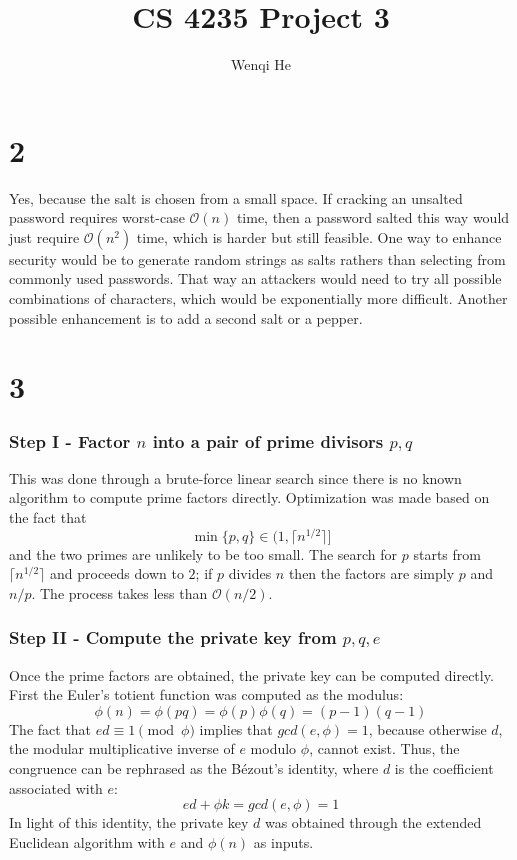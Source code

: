 \documentclass[11pt]{article}
\title{CS 4235 Project 3}
\author{Wenqi He}
\begin{document}
\maketitle
\section*{2}
Yes, because the salt is chosen from a small space. If cracking an unsalted password requires worst-case $\mathcal{O}(n)$ time, then a password salted this way would just require $\mathcal{O}(n^2)$ time, which is harder but still feasible.
One way to enhance security would be to generate random strings  as salts rathers than selecting from commonly used passwords. That way an attackers would need to try all possible combinations of characters, which would be exponentially more difficult. Another possible enhancement is to add a second salt or a pepper.
\section*{3}
\subsubsection*{Step I - Factor $n$ into a pair of prime divisors $p, q$} This was done through a brute-force linear search since there is no known algorithm to compute prime factors directly. Optimization was made based on the fact that
\[ \min\{p,q\} \in (1, \lceil n^{1/2} \rceil]\]
and the two primes are unlikely to be too small. The search for $p$ starts from $\lceil n^{1/2} \rceil$ and proceeds down to $2$; if $p$ divides $n$ then the factors are simply $p$ and $n/p$. The process takes less than $\mathcal{O}(n/2)$.
\subsubsection*{Step II - Compute the private key from $p,q,e$} Once the prime factors are obtained, the private key can be computed directly. First the Euler's totient function was computed as the modulus:
\[ \phi(n) = \phi(pq) = \phi(p)\phi(q) = (p-1)(q-1) \]
The fact that $ed \equiv 1 \pmod{\phi}$ implies that $gcd(e,\phi) =1$, because otherwise $d$, the modular multiplicative inverse of $e$ modulo $\phi$, cannot exist. Thus, the congruence can be rephrased as the Bézout's identity, where $d$ is the coefficient associated with $e$:
\[ ed + \phi k = gcd(e,\phi) = 1 \]
In light of this identity, the private key $d$ was obtained through the extended Euclidean algorithm with $e$ and $\phi(n)$ as inputs.
\end{document}
